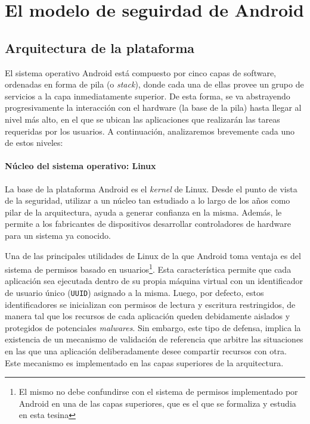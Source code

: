 \chapter{El modelo de seguirdad de Android}
\label{chapter:background}

\section{Arquitectura de la plataforma}
\label{section:architecture}

El sistema operativo Android está compuesto por cinco capas de software, ordenadas en forma de pila (o
\textit{stack}), donde cada una de ellas provee un grupo de servicios a la capa inmediatamente
superior. De esta forma, se va abstrayendo progresivamente la interacción con el hardware (la base de
la pila) hasta llegar al nivel más alto, en el que se ubican las aplicaciones que realizarán las tareas
requeridas por los usuarios. A continuación, analizaremos brevemente cada uno de estos niveles:

\subsubsection*{Núcleo del sistema operativo: Linux}
\label{section:architecture:kernel}
La base de la plataforma Android es el \textit{kernel} de Linux. Desde el punto de vista de la
seguridad, utilizar a un núcleo tan estudiado a lo largo de los años como pilar de la arquitectura,
ayuda a generar confianza en la misma. Además, le permite a los fabricantes de dispositivos
desarrollar controladores de hardware para un sistema ya conocido.

Una de las principales utilidades de Linux de la que Android toma ventaja es del sistema de permisos
basado en usuarios\footnote{El mismo no debe confundirse con el sistema de permisos implementado por
    Android en una de las capas superiores, que es el que se formaliza y estudia en esta tesina}. Esta
característica permite que cada aplicación sea ejecutada dentro de su propia máquina virtual con un
identificador de usuario único (\texttt{UUID}) asignado a la misma. Luego, por defecto, estos
identificadores se inicializan con permisos de lectura y escritura restringidos, de manera tal que los
recursos de cada aplicación queden debidamente aislados y protegidos de potenciales \textit{malwares}.
Sin embargo, este tipo de defensa, implica la existencia de un mecanismo de validación de referencia
que arbitre las situaciones en las que una aplicación deliberadamente desee compartir recursos con
otra. Este mecanismo es implementado en las capas superiores de la arquitectura.

